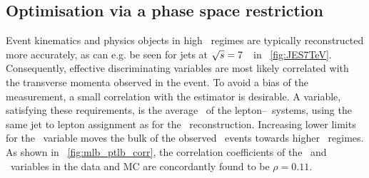 



























\subsection{Optimisation via a phase space restriction}
\label{sect:evlselopticut}
%
Event kinematics and physics objects in high \pt\ regimes are typically reconstructed more accurately, as can e.g. be seen for jets at ${\sqrt{s}}=7$~\TeV\ in \fig~\ref{fig:JES7TeV}. Consequently, effective discriminating variables are most likely correlated with the transverse momenta observed in the event.
%
To avoid a bias of the measurement, a small correlation with the estimator is desirable.
%
A variable, satisfying these requirements, is the average \pt\ of the lepton--\bjet\ systems, using the same jet to lepton assignment as for the \mlbr\ reconstruction.
%
Increasing lower limits for the \ptlb\ variable moves the bulk of the observed \ttbar\ events towards higher \pt\ regimes. 
%
As shown in \fig~\ref{fig:mlb_ptlb_corr}, the correlation coefficients of the \mlbr\ and \ptlb\ variables in the data and \gls{MC} are concordantly found to be $\rho=0.11$. 


